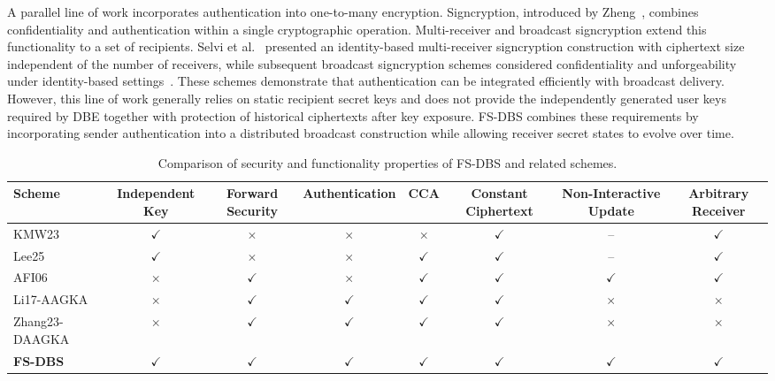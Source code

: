 \documentclass[sigconf,anonymous]{acmart}
\theoremstyle{definition}
\theoremstyle{definition}
\theoremstyle{definition}
\theoremstyle{definition}
\theoremstyle{definition}
\theoremstyle{definition}
\theoremstyle{definition}
\theoremstyle{definition}
\theoremstyle{definition}
\begin{document}
A parallel line of work incorporates authentication into one-to-many encryption. Signcryption, introduced by Zheng~\cite{Zheng1997}, combines confidentiality and authentication within a single cryptographic operation. Multi-receiver and broadcast signcryption extend this functionality to a set of recipients. Selvi et al.~\cite{selvi2009multireceiver} presented an identity-based multi-receiver signcryption construction with ciphertext size independent of the number of receivers, while subsequent broadcast signcryption schemes considered confidentiality and unforgeability under identity-based settings~\cite{selvi2009broadcast,zhang2011broadcast}. These schemes demonstrate that authentication can be integrated efficiently with broadcast delivery. However, this line of work generally relies on static recipient secret keys and does not provide the independently generated user keys required by DBE together with protection of historical ciphertexts after key exposure. FS-DBS combines these requirements by incorporating sender authentication into a distributed broadcast construction while allowing receiver secret states to evolve over time.
\begin{table}[htbp]
	\centering
	\caption{Comparison of security and functionality properties of FS-DBS and related schemes.}
	\label{tab:property_comparison}
	\small
	\setlength{\tabcolsep}{3pt}
	\renewcommand{\arraystretch}{1.15}
	
	\begin{tabular*}{\textwidth}{@{\extracolsep{\fill}}lccccccc@{}}
		\toprule
		Scheme &
		Independent Key  &
		Forward Security &
		Authentication &
		CCA &
		Constant Ciphertext &
		Non-Interactive Update &
		Arbitrary Receiver \\
		\midrule
		
		KMW23~\cite{kolonelos2023distributed}
		& $\checkmark$ & $\times$ & $\times$ & $\times$ & $\checkmark$ & -- & $\checkmark$ \\
		
		Lee25~\cite{lee2025cca}
		& $\checkmark$ & $\times$ & $\times$ & $\checkmark$ & $\checkmark$ & -- & $\checkmark$ \\
		
		AFI06~\cite{attrapadung2006forward}
		& $\times$ & $\checkmark$ & $\times$ & $\checkmark$ & $\checkmark$ & $\checkmark$ & $\checkmark$ \\
		
		Li17-AAGKA~\cite{li2017aagka}
		& $\times$ & $\checkmark$ & $\checkmark$ & $\checkmark$ & $\checkmark$ & $\times$ & $\times$ \\
		
		Zhang23-DAAGKA~\cite{zhang2023daagka}
		& $\times$ & $\checkmark$ & $\checkmark$ & $\checkmark$ & $\checkmark$ & $\times$ & $\times$ \\
		
		\midrule
		\textbf{FS-DBS}
		& $\checkmark$ & $\checkmark$ & $\checkmark$ & $\checkmark$ & $\checkmark$ & $\checkmark$ & $\checkmark$ \\
		
		\bottomrule
	\end{tabular*}
\end{table}
\end{document}
